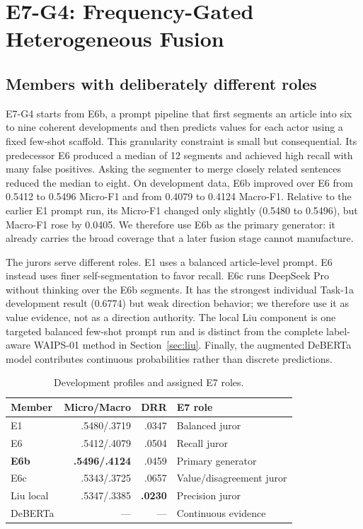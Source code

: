 \documentclass[sigconf,article,a4paper]{acmart}
\begin{document}
\section{E7-G4: Frequency-Gated Heterogeneous Fusion}
\label{sec:e7}

\subsection{Members with deliberately different roles}

E7-G4 starts from E6b, a prompt pipeline that first segments an article into
six to nine coherent developments and then predicts values for each actor using
a fixed few-shot scaffold. This granularity constraint is small but
consequential. Its predecessor E6 produced a median of 12 segments and achieved
high recall with many false positives. Asking the segmenter to merge closely
related sentences reduced the median to eight. On development data, E6b
improved over E6 from 0.5412 to 0.5496 Micro-F1 and from 0.4079 to 0.4124
Macro-F1. Relative to the earlier E1 prompt run, its Micro-F1 changed only
slightly (0.5480 to 0.5496), but Macro-F1 rose by 0.0405. We therefore use E6b
as the primary generator: it already carries the broad coverage that a later
fusion stage cannot manufacture.

The jurors serve different roles. E1 uses a balanced article-level prompt. E6
instead uses finer self-segmentation to favor recall. E6c runs DeepSeek Pro
without thinking over the E6b segments. It has the strongest individual
Task-1a development result (0.6774) but weak direction behavior; we therefore
use it as value evidence, not as a direction authority. The local Liu component is one
targeted balanced few-shot prompt run and is distinct from the
complete label-aware WAIPS-01 method in Section~\ref{sec:liu}. Finally, the
augmented DeBERTa model contributes continuous probabilities rather than
discrete predictions.

\begin{table}[t]
  \caption{Development profiles and assigned E7 roles.}
  \label{tab:members}
  \scriptsize
  \begin{tabularx}{\columnwidth}{@{}lrrX@{}}
    \toprule
    Member & Micro/Macro & DRR & E7 role \\
    \midrule
    E1 & .5480/.3719 & .0347 & Balanced juror \\
    E6 & .5412/.4079 & .0504 & Recall juror \\
    \textbf{E6b} & \textbf{.5496/.4124} & .0459 & Primary generator \\
    E6c & .5343/.3725 & .0657 & Value/disagreement juror \\
    Liu local & .5347/.3385 & \textbf{.0230} & Precision juror \\
    DeBERTa & --- & --- & Continuous evidence \\
    \bottomrule
  \end{tabularx}
\end{table}
\end{document}

